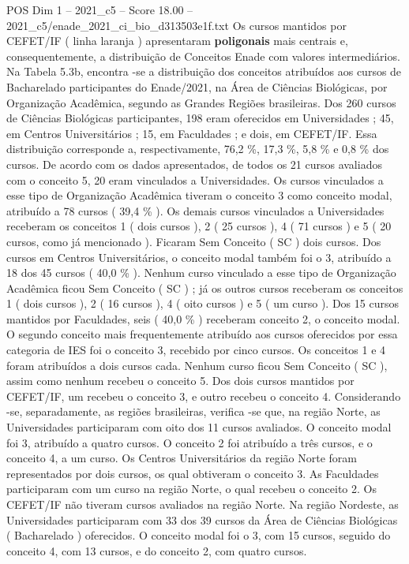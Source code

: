\begin{textsample}{POS Dim 1 – 2021\_c5 – Score 18.00 – 2021\_c5/enade\_2021\_ci\_bio\_d313503e1f.txt}
Os cursos mantidos por CEFET/IF ( linha laranja ) apresentaram \textbf{poligonais} mais centrais e, consequentemente, a distribuição de Conceitos Enade com valores intermediários.
Na Tabela 5.3b, encontra -se a distribuição dos conceitos atribuídos aos cursos de Bacharelado participantes do Enade/2021, na Área de Ciências Biológicas, por Organização Acadêmica, segundo as Grandes Regiões brasileiras.
Dos 260 cursos de Ciências Biológicas participantes, 198 eram oferecidos em Universidades ; 45, em Centros Universitários ; 15, em Faculdades ; e dois, em CEFET/IF.
Essa distribuição corresponde a, respectivamente, 76,2 \%, 17,3 \%, 5,8 \% e 0,8 \% dos cursos.
De acordo com os dados apresentados, de todos os 21 cursos avaliados com o conceito 5, 20 eram vinculados a Universidades.
Os cursos vinculados a esse tipo de Organização Acadêmica tiveram o conceito 3 como conceito modal, atribuído a 78 cursos ( 39,4 \% ).
Os demais cursos vinculados a Universidades receberam os conceitos 1 ( dois cursos ), 2 ( 25 cursos ), 4 ( 71 cursos ) e 5 ( 20 cursos, como já mencionado ).
Ficaram Sem Conceito ( SC ) dois cursos.
Dos cursos em Centros Universitários, o conceito modal também foi o 3, atribuído a 18 dos 45 cursos ( 40,0 \% ).
Nenhum curso vinculado a esse tipo de Organização Acadêmica ficou Sem Conceito ( SC ) ; já os outros cursos receberam os conceitos 1 ( dois cursos ), 2 ( 16 cursos ), 4 ( oito cursos ) e 5 ( um curso ).
Dos 15 cursos mantidos por Faculdades, seis ( 40,0 \% ) receberam conceito 2, o conceito modal.
O segundo conceito mais frequentemente atribuído aos cursos oferecidos por essa categoria de IES foi o conceito 3, recebido por cinco cursos.
Os conceitos 1 e 4 foram atribuídos a dois cursos cada.
Nenhum curso ficou Sem Conceito ( SC ), assim como nenhum recebeu o conceito 5.
Dos dois cursos mantidos por CEFET/IF, um recebeu o conceito 3, e outro recebeu o conceito 4.
Considerando -se, separadamente, as regiões brasileiras, verifica -se que, na região Norte, as Universidades participaram com oito dos 11 cursos avaliados.
O conceito modal foi 3, atribuído a quatro cursos.
O conceito 2 foi atribuído a três cursos, e o conceito 4, a um curso.
Os Centros Universitários da região Norte foram representados por dois cursos, os qual obtiveram o conceito 3.
As Faculdades participaram com um curso na região Norte, o qual recebeu o conceito 2.
Os CEFET/IF não tiveram cursos avaliados na região Norte.
Na região Nordeste, as Universidades participaram com 33 dos 39 cursos da Área de Ciências Biológicas ( Bacharelado ) oferecidos.
O conceito modal foi o 3, com 15 cursos, seguido do conceito 4, com 13 cursos, e do conceito 2, com quatro cursos.

\end{textsample}

